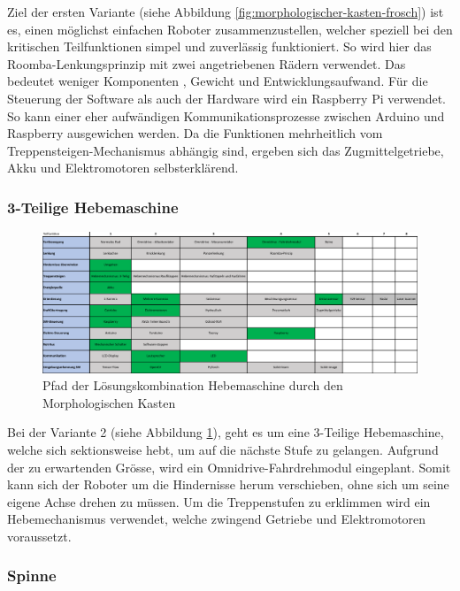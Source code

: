 Ziel der ersten Variante (siehe Abbildung \ref{fig:morphologischer-kasten-frosch}) ist es, einen möglichst einfachen Roboter zusammenzustellen, welcher speziell bei den kritischen Teilfunktionen simpel und zuverlässig funktioniert. So wird hier das Roomba-Lenkungsprinzip mit zwei angetriebenen Rädern verwendet. Das bedeutet weniger Komponenten , Gewicht und Entwicklungsaufwand. 
Für die  Steuerung der Software als auch der Hardware wird ein Raspberry Pi verwendet. So kann einer eher aufwändigen Kommunikationsprozesse zwischen Arduino und Raspberry ausgewichen werden. 
Da die Funktionen mehrheitlich vom Treppensteigen-Mechanismus abhängig sind, ergeben sich das Zugmittelgetriebe, Akku und Elektromotoren selbsterklärend. 

\subsubsection*{3-Teilige Hebemaschine}
\begin{figure}[h]
  \includegraphics[width=1.0\textwidth]{img/morphologische-kaesten/Morphologischer_Kasten_Hebe}
  \centering
  \caption{Pfad der Lösungskombination Hebemaschine durch den Morphologischen Kasten}
  \label{fig:morphologischer-kasten-3teiler}
\end{figure}
   
Bei der Variante 2 (siehe Abbildung \ref{fig:morphologischer-kasten-3teiler}), geht es um eine 3-Teilige Hebemaschine, welche sich sektionsweise hebt, um auf die nächste Stufe zu gelangen. Aufgrund der zu erwartenden Grösse, wird ein Omnidrive-Fahrdrehmodul eingeplant. Somit kann sich der Roboter um die Hindernisse herum verschieben, ohne sich um seine eigene Achse drehen zu müssen. Um die Treppenstufen zu erklimmen wird ein Hebemechanismus verwendet, welche zwingend Getriebe und Elektromotoren voraussetzt.

\subsubsection*{Spinne}
